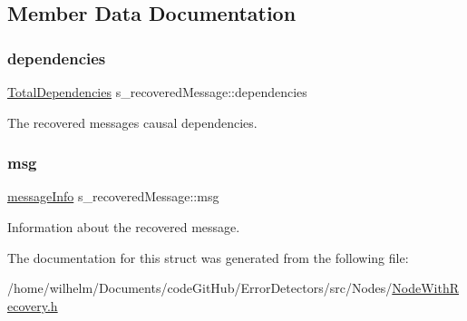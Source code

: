 \subsection{Member Data Documentation}
\mbox{\label{structs__recovered_message_a95db2608749458c7b7e70bd5b612ba2d}} 
\subsubsection{\texorpdfstring{dependencies}{dependencies}}
{\footnotesize\ttfamily \hyperlink{class_total_dependencies}{Total\+Dependencies} s\+\_\+recovered\+Message\+::dependencies}



The recovered message\textquotesingle{}s causal dependencies. 

\mbox{\label{structs__recovered_message_a585360581eb2222b2a9ec5b91076054a}} 
\subsubsection{\texorpdfstring{msg}{msg}}
{\footnotesize\ttfamily \hyperlink{structures_8h_a7e7bdc1d2fff8a9436f2f352b2711ed6}{message\+Info} s\+\_\+recovered\+Message\+::msg}



Information about the recovered message. 



The documentation for this struct was generated from the following file\+:\begin{DoxyCompactItemize}
\item 
/home/wilhelm/\+Documents/code\+Git\+Hub/\+Error\+Detectors/src/\+Nodes/\hyperlink{_node_with_recovery_8h}{Node\+With\+Recovery.\+h}\end{DoxyCompactItemize}
